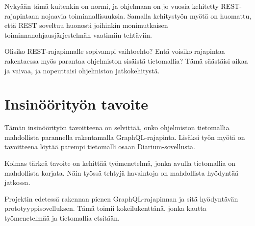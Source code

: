 Nykyään tämä kuitenkin on normi, ja ohjelmaan on jo vuosia kehitetty
REST-rajapintaan nojaavia toiminnallisuuksia. Samalla kehitystyön myötä
on huomattu, että REST soveltuu huonosti joihinkin monimutkaisen
toiminnanohjausjärjestelmän vaatimiin tehtäviin.

Olisiko REST-rajapinnalle sopivampi vaihtoehto? Entä voisiko rajapintaa
rakentaessa myös parantaa ohjelmiston sisäistä tietomallia? Tämä
säästäisi aikaa ja vaivaa, ja nopeuttaisi ohjelmiston jatkokehitystä.

\hypertarget{insinuxf6uxf6rityuxf6n-tavoite}{%
\section{Insinöörityön tavoite}\label{insinuxf6uxf6rityuxf6n-tavoite}}

Tämän insinöörityön tavoitteena on selvittää, onko ohjelmiston
tietomallia mahdollista parannella rakentamalla GraphQL-rajapinta.
Lisäksi työn myötä on tavoitteena löytää parempi tietomalli osaan
Diarium-sovellusta.

Kolmas tärkeä tavoite on kehittää työmenetelmä, jonka avulla tietomallia
on mahdollista korjata. Näin työssä tehtyjä havaintoja on mahdollista
hyödyntää jatkossa.

Projektin edetessä rakennan pienen GraphQL-rajapinnan ja sitä
hyödyntävän prototyyppisovelluksen. Tämä toimii kokeilukenttänä, jonka
kautta työmenetelmää ja tietomallia etsitään.
